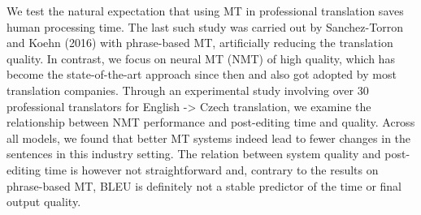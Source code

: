We test the natural expectation that using MT in professional translation saves human processing time. The last such study was carried out by Sanchez-Torron and Koehn (2016) with phrase-based MT, artificially reducing the translation quality. In contrast, we focus on neural MT (NMT) of high quality, which has become the state-of-the-art approach since then and also got adopted by most translation companies. Through an experimental study involving over 30 professional translators for English -> Czech translation, we examine the relationship between NMT performance and post-editing time and quality. Across all models, we found that better MT systems indeed lead to fewer changes in the sentences in this industry setting. The relation between system quality and post-editing time is however not straightforward and, contrary to the results on phrase-based MT, BLEU is definitely not a stable predictor of the time or final output quality.
